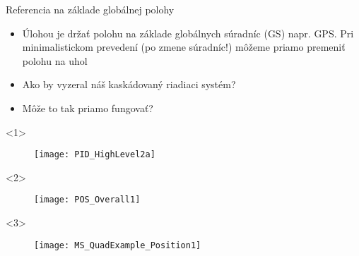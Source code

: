 

  \begin{frame}[t]{Referencia na základe globálnej polohy}
\begin{itemize}
  \item<1-> Úlohou je držať polohu na základe globálnych súradníc (GS) napr. GPS. Pri minimalistickom prevedení (po zmene súradníc!) môžeme priamo premeniť polohu na uhol
  \item<2-> Ako by vyzeral náš kaskádovaný riadiaci systém?
  \item<3-> Môže to tak priamo fungovať?
\end{itemize}

  \begin{onlyenv}<1>
  \begin{figure}
\centering
  \texttt{[image: PID\_HighLevel2a]}\\
\end{figure}
\end{onlyenv}

  \begin{onlyenv}<2>
  \begin{figure}
\centering
  \texttt{[image: POS\_Overall1]}\\
\end{figure}
\end{onlyenv}

  \begin{onlyenv}<3>
  \begin{figure}
\centering
  \texttt{[image: MS\_QuadExample\_Position1]}\\
\end{figure}
\end{onlyenv}
\end{frame}


